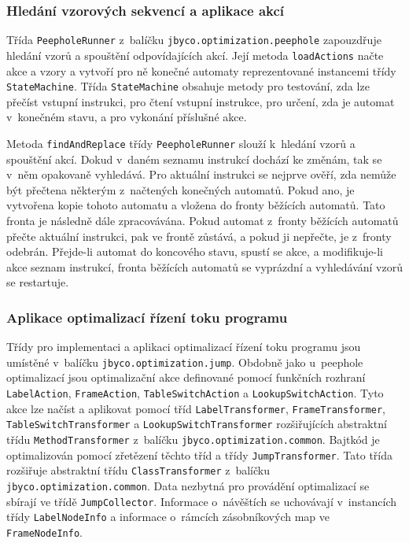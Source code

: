 \subsubsection{Hledání vzorových sekvencí a aplikace akcí}

Třída \texttt{PeepholeRunner} z~balíčku \texttt{jbyco.optimization.peephole} zapouzdřuje hledání vzorů a spouštění odpovídajících akcí. Její metoda \texttt{loadActions} načte akce a vzory a vytvoří pro ně konečné automaty reprezentované instancemi třídy \texttt{StateMachine}. Třída \texttt{StateMachine} obsahuje metody pro testování, zda lze přečíst vstupní instrukci, pro čtení vstupní instrukce, pro určení, zda je automat v~konečném stavu, a pro vykonání příslušné akce. 

Metoda \texttt{findAndReplace} třídy \texttt{PeepholeRunner} slouží k~hledání vzorů a spouštění akcí. Dokud v~daném seznamu instrukcí dochází ke změnám, tak se v~něm opakovaně vyhledává. Pro aktuální instrukci se nejprve ověří, zda nemůže být přečtena některým z~načtených konečných automatů. Pokud ano, je vytvořena kopie tohoto automatu a vložena do fronty běžících automatů. Tato fronta je následně dále zpracovávána. Pokud automat z~fronty běžících automatů přečte aktuální instrukci, pak ve frontě zůstává, a pokud ji nepřečte, je z~fronty odebrán. Přejde-li automat do koncového stavu, spustí se akce, a modifikuje-li akce seznam instrukcí, fronta běžících automatů se vyprázdní a vyhledávání vzorů se restartuje.

\subsubsection{Aplikace optimalizací řízení toku programu}

Třídy pro implementaci a aplikaci optimalizací řízení toku programu jsou umístěné v~balíčku \texttt{jbyco.optimization.jump}. Obdobně jako u~peephole optimalizací jsou optimalizační akce definované pomocí funkčních rozhraní \texttt{LabelAction}, \texttt{FrameAction}, \texttt{TableSwitchAction} a \texttt{LookupSwitchAction}. Tyto akce lze načíst a aplikovat pomocí tříd \texttt{LabelTransformer}, \texttt{FrameTransformer}, \texttt{TableSwitchTransformer} a \texttt{LookupSwitchTransformer} rozšiřujících abstraktní třídu \texttt{MethodTransformer} z~balíčku \texttt{jbyco.optimization.common}.
Bajtkód je optimalizován pomocí zřetězení těchto tříd a třídy \texttt{JumpTransformer}. Tato třída rozšiřuje abstraktní třídu \texttt{ClassTransformer} z~balíčku \texttt{jbyco.optimization.common}.
Data nezbytná pro provádění optimalizací se sbírají ve třídě \texttt{JumpCollector}. Informace o~návěštích se uchovávají v~instancích třídy \texttt{LabelNodeInfo} a informace o~rámcích zásobníkových map ve \texttt{FrameNodeInfo}.

